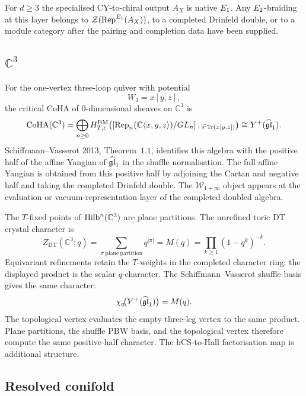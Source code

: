 For \(d\geq 3\) the specialised CY-to-chiral output \(A_X\) is native
\(E_1\). Any \(E_2\)-braiding at this layer belongs to
\(\mathcal Z(\mathrm{Rep}^{E_1}(A_X))\), to a completed Drinfeld double, or
to a module category after the pairing and completion data have been
supplied.

\subsection*{$\mathbb C^3$}

For the one-vertex three-loop quiver with potential
\[
  W_3=x[y,z],
\]
the critical CoHA of \(0\)-dimensional sheaves on \(\mathbb C^3\) is
\[
  \mathrm{CoHA}(\mathbb C^3)
  =
  \bigoplus_{n\geq 0}
  H^{\mathrm{BM}}_{T,c}\!\left(
    \left[\mathrm{Rep}_n(\mathbb C\langle x,y,z\rangle)/GL_n\right],
    \varphi_{\mathrm{Tr}(x[y,z])}
  \right)
  \cong
  Y^{+}(\widehat{\mathfrak{gl}}_1).
\]
Schiffmann--Vasserot 2013, Theorem~$1.1$, identifies this algebra
with the positive half of the affine Yangian of \(\widehat{\mathfrak{gl}}_1\) in the
shuffle normalisation. The full affine Yangian is obtained from this
positive half by adjoining the Cartan and negative half and taking the
completed Drinfeld double. The \(\mathcal W_{1+\infty}\) object appears
at the evaluation or vacuum-representation layer of the completed
doubled algebra.

The $T$-fixed points of $\mathrm{Hilb}^n(\mathbb C^3)$ are plane partitions.
The unrefined toric DT crystal character is
\[
  Z_{\mathrm{DT}}(\mathbb C^3;q)
  =
  \sum_{\pi\ \mathrm{plane\ partition}} q^{|\pi|}
  =
  M(q)
  =
  \prod_{k\geq 1}(1-q^k)^{-k}.
\]
Equivariant refinements retain the \(T\)-weights in the completed
character ring; the displayed product is the scalar \(q\)-character.
The Schiffmann--Vasserot shuffle basis gives the same character:
\[
  \chi_q\!\bigl(Y^{+}(\widehat{\mathfrak{gl}}_1)\bigr)=M(q).
\]
The topological vertex evaluates the empty three-leg vertex to the
same product. Plane partitions, the shuffle PBW basis, and the
topological vertex therefore compute the same positive-half character.
The hCS-to-Hall factorisation map is additional structure.

\subsection*{Resolved conifold}

